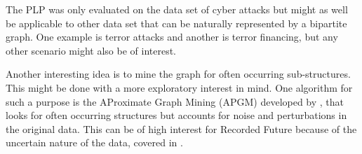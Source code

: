 The PLP was only evaluated on the data set of cyber attacks but might as well be applicable to other data set that can be naturally represented by a bipartite graph. One example is terror attacks and another is terror financing, but any other scenario might also be of interest.

Another interesting idea is to mine the graph for often occurring sub-structures. This might be done with a more exploratory interest in mind. One algorithm for such a purpose is the AProximate Graph Mining (APGM) developed by \citet{Jia2011}, that looks for often occurring structures but accounts for noise and perturbations in the original data. This can be of high interest for Recorded Future because of the uncertain nature of the data, covered in .
